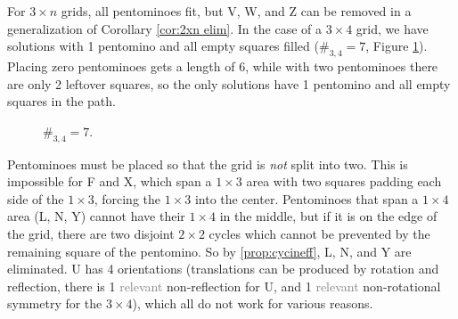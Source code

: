 \documentclass{article}
\theoremstyle{definition}%
\newcommand{\minordetail}[1]{\textcolor{gray}{#1}}
\begin{document}
For $3 \times n$ grids, all pentominoes fit, but V, W, and Z can be removed in a generalization of Corollary \ref{cor:2xn elim}. In the case of a $3 \times 4$ grid, we have solutions with 1 pentomino and all empty squares filled ($\#_{3, 4} = 7$, Figure \ref{fig:3x4}). Placing zero pentominoes gets a length of 6, while with two pentominoes there are only 2 leftover squares, so the only solutions have 1 pentomino and all empty squares in the path.

\begin{figure}
    \centering
    \caption{$\#_{3, 4} = 7$. \cite[6:04]{v2}}
    \label{fig:3x4}
\end{figure}

Pentominoes must be placed so that the grid is \emph{not} split into two. This is impossible for F and X, which span a $1 \times 3$ area with two squares padding each side of the $1 \times 3$, forcing the $1 \times 3$ into the center. Pentominoes that span a $1 \times 4$ area (L, N, Y) cannot have their $1 \times 4$ in the middle, but if it is on the edge of the grid, there are two disjoint $2 \times 2$ cycles which cannot be prevented by the remaining square of the pentomino. So by \ref{prop:cycineff}, L, N, and Y are eliminated. U has 4 orientations (translations can be produced by rotation and reflection, there is 1 \minordetail{relevant} non-reflection for U, and 1 \minordetail{relevant} non-rotational symmetry for the $3 \times 4$), which all do not work for various reasons.
\end{document}
